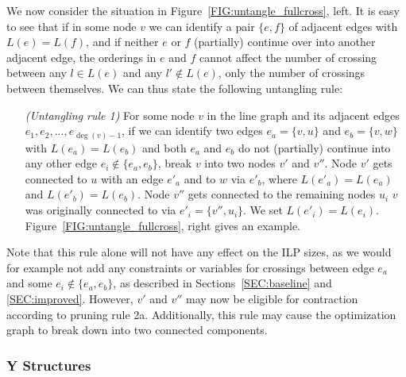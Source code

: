 \documentclass[format=acmsmall, review=false, screen=true]{acmart}
\begin{document}
We now consider the situation in Figure~\ref{FIG:untangle_fullcross}, left. It is easy to see that if in some node $v$ we can identify a pair $\{e, f\}$ of adjacent edges with $L(e) = L(f)$, and if neither $e$ or $f$ (partially) continue over into another adjacent edge, the orderings in $e$ and $f$ cannot affect the number of crossing between any $l \in L(e)$ and any $l' \not\in L(e)$, only the number of crossings between themselves. We can thus state the following untangling rule:
\begin{enumerate}[parsep=0.5mm, wide, labelwidth=0mm, itemindent=2.3mm]
  \setlength\itemsep{1pt}
  \item[\emph{(Untangling rule 1)}] For some node $v$ in the line graph and its adjacent edges $e_1, e_2, ..., e_{\deg(v)-1}$, if we can identify two edges $e_a = \{v, u\}$ and $e_b = \{v, w\}$ with $L(e_a) = L(e_b)$ and both $e_a$ and $e_b$ do not (partially) continue into any other edge $e_i \not\in \{e_a, e_b\}$, break $v$ into two nodes $v'$ and $v''$. Node $v'$ gets connected to $u$ with an edge $e'_a$ and to $w$ via $e'_b$, where $L(e'_a) = L(e_a)$ and $L(e'_b) = L(e_b)$. Node $v''$ gets connected to the remaining nodes $u_i$ $v$ was originally connected to via $e'_i = \{v'', u_i\}$. We set $L(e'_i) = L(e_i)$. Figure~\ref{FIG:untangle_fullcross}, right gives an example.
\end{enumerate}

Note that this rule alone will not have any effect on the ILP sizes, as we would for example not add any constraints or variables for crossings between edge $e_a$ and some $e_i \not\in \{e_a, e_b\}$, as described in Sections~\ref{SEC:baseline} and \ref{SEC:improved}. However, $v'$ and $v''$ may now be eligible for contraction according to pruning rule 2a. Additionally, this rule may cause the optimization graph to break down into two connected components.

\subsubsection{Y Structures}
\end{document}
